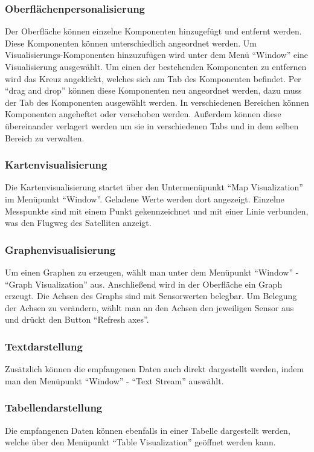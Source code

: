 \subsubsection{Oberflächenpersonalisierung}
Der Oberfläche können einzelne Komponenten hinzugefügt und entfernt werden. Diese Komponenten können unterschiedlich angeordnet werden. Um Visualisierungs-Komponenten hinzuzufügen wird unter dem Menü ``Window'' eine Visualisierung ausgewählt.
Um einen der bestehenden Komponenten zu entfernen wird das Kreuz angeklickt, welches sich am Tab des Komponenten befindet. Per ``drag and drop''  können diese Komponenten neu angeordnet werden, dazu muss der Tab des Komponenten ausgewählt werden. In verschiedenen Bereichen können Komponenten angeheftet oder verschoben werden. Außerdem können diese übereinander verlagert werden um sie in verschiedenen Tabs und in dem selben Bereich zu verwalten.

\subsubsection{Kartenvisualisierung}
Die Kartenvisualisierung startet über den Untermenüpunkt ``Map Visualization'' im Menüpunkt ``Window''. Geladene Werte werden dort angezeigt. Einzelne Messpunkte sind mit einem Punkt gekennzeichnet und mit einer Linie verbunden, was den Flugweg des Satelliten anzeigt.

\subsubsection{Graphenvisualisierung}
Um einen Graphen zu erzeugen, wählt man unter dem Menüpunkt ``Window'' - ``Graph Visualization'' aus. Anschließend wird in der Oberfläche ein Graph erzeugt. Die Achsen des Graphs sind mit Sensorwerten belegbar. Um Belegung der Achsen zu verändern, wählt man an den Achsen den jeweiligen Sensor aus und drückt den Button ``Refresh axes''.

\subsubsection{Textdarstellung}
Zusätzlich können die empfangenen Daten auch direkt dargestellt werden, indem man den Menüpunkt ``Window'' - ``Text Stream'' auswählt.

\subsubsection {Tabellendarstellung}
Die empfangenen Daten können ebenfalls in einer Tabelle dargestellt werden, welche über den Menüpunkt ``Table Visualization'' geöffnet werden kann.

